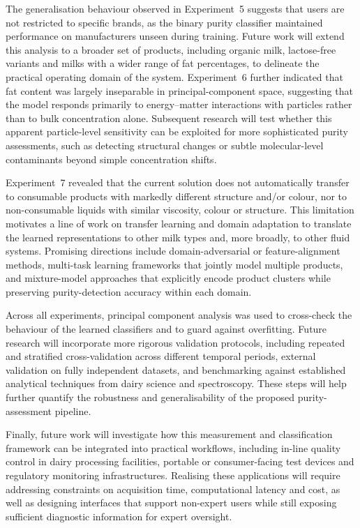 \documentclass[12pt,a4paper,oneside]{report}
\begin{document}
The generalisation behaviour observed in Experiment~5 suggests that users are not restricted to specific brands, as the binary purity classifier maintained performance on manufacturers unseen during training. Future work will extend this analysis to a broader set of products, including organic milk, lactose-free variants and milks with a wider range of fat percentages, to delineate the practical operating domain of the system. Experiment~6 further indicated that fat content was largely inseparable in principal-component space, suggesting that the model responds primarily to energy--matter interactions with particles rather than to bulk concentration alone. Subsequent research will test whether this apparent particle-level sensitivity can be exploited for more sophisticated purity assessments, such as detecting structural changes or subtle molecular-level contaminants beyond simple concentration shifts.

Experiment~7 revealed that the current solution does not automatically transfer to consumable products with markedly different structure and/or colour, nor to non-consumable liquids with similar viscosity, colour or structure. This limitation motivates a line of work on transfer learning and domain adaptation to translate the learned representations to other milk types and, more broadly, to other fluid systems. Promising directions include domain-adversarial or feature-alignment methods, multi-task learning frameworks that jointly model multiple products, and mixture-model approaches that explicitly encode product clusters while preserving purity-detection accuracy within each domain.

Across all experiments, principal component analysis was used to cross-check the behaviour of the learned classifiers and to guard against overfitting. Future research will incorporate more rigorous validation protocols, including repeated and stratified cross-validation across different temporal periods, external validation on fully independent datasets, and benchmarking against established analytical techniques from dairy science and spectroscopy. These steps will help further quantify the robustness and generalisability of the proposed purity-assessment pipeline.

Finally, future work will investigate how this measurement and classification framework can be integrated into practical workflows, including in-line quality control in dairy processing facilities, portable or consumer-facing test devices and regulatory monitoring infrastructures. Realising these applications will require addressing constraints on acquisition time, computational latency and cost, as well as designing interfaces that support non-expert users while still exposing sufficient diagnostic information for expert oversight.
\newpage
\end{document}

